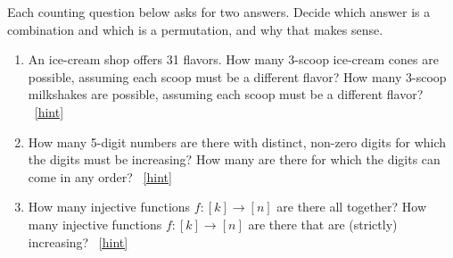 \documentclass{book}
\begin{document}
\setcounter{project}{116}
\addtocounter{project}{-1}
\begin{activity}[]\label{activity-109}
\hypertarget{p-834}{}%
Each counting question below asks for two answers.  Decide which answer is a combination and which is a permutation, and why that makes sense.%
\begin{enumerate}[font=\bfseries,label=(\alph*),ref=\alph*]
\item\label{task-150} \hypertarget{p-835}{}%
An ice-cream shop offers 31 flavors.  How many 3-scoop ice-cream cones are possible, assuming each scoop must be a different flavor?  How many 3-scoop milkshakes are possible, assuming each scoop must be a different flavor?%
~\hfill{\tiny\hyperlink{a-116.a}{[hint]}\hypertarget{q-116.a}{}}\item\label{task-151} \hypertarget{p-837}{}%
How many 5-digit numbers are there with distinct, non-zero digits for which the digits must be increasing?  How many are there for which the digits can come in any order?%
~\hfill{\tiny\hyperlink{a-116.b}{[hint]}\hypertarget{q-116.b}{}}\item\label{task-152} \hypertarget{p-839}{}%
How many injective functions \(f:[k] \to [n]\) are there all   together?  How many injective functions \(f:[k] \to [n]\) are there that are (strictly) increasing?%
~\hfill{\tiny\hyperlink{a-116.c}{[hint]}\hypertarget{q-116.c}{}}\end{enumerate}
\end{activity}
\end{document}
